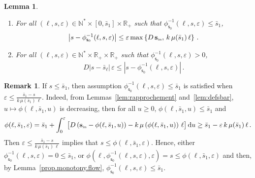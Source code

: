 \documentclass[10pt]{amsart}
\newtheorem{lemm}[theo]{Lemma}\newtheorem{prop}[theo]{Proposition}\newtheorem{coro}[theo]{Corollary}\newtheorem{conj}[theo]{Conjecture}
\theoremstyle{definition}\newtheorem{defi}[theo]{Definition}\newtheorem{rema}[theo]{Remark}\newtheorem{exam}[theo]{Example}\newtheorem{exem}[theo]{Example}\newtheorem{nota}[theo]{Notation}
\newcommand{\RR}{\mathbb{R}}
\newcommand{\NN}{\mathbb{N}}
\newcommand{\Sin}{{\mathbf s}_{\textrm{\tiny\rm in}}}
\newcommand{\dif}{\mathrm{d}}
\newcommand{\barmu}{\mu(\bar s_1)}
\newcommand{\phis}{\phi_{\textsf{s}_0}^{-1}}
\newcommand{\1}{\mathbf{1}}
\begin{document}
\begin{lemm}\label{lemme.control.phi_moins_s}\leavevmode
\begin{enumerate}
\item \label{lemme.control.phi_moins_s.maj}
For all $(\ell,s,\varepsilon)\in \NN^* \times [0,\bar s_1]\times \RR_+$ such that $\phis(\ell,s,\varepsilon)\leq \bar s_1$,
\[
\left|s-\phis(\ell,s,\varepsilon)\right| \leq \varepsilon \max\left\{D\,\Sin,\,k\,\barmu\,\ell\right\}\,.
\]
\item \label{lemme.control.phi_moins_s.min}
For all $(\ell,s,\varepsilon)\in \NN^* \times \RR_+\times \RR_+$ such that $\phis(\ell,s,\varepsilon)>0$,
\[
D|s-\bar s_\ell|\,\varepsilon \leq \left|s-\phis(\ell,s,\varepsilon)\right|\,.
\]
\end{enumerate}
\end{lemm}


\begin{rema}\label{phis0.less.sin}
If $s\leq \bar s_1$, then assumption $\phis(\ell,s,\varepsilon)\leq \bar s_1$ is satisfied when $\varepsilon\leq \frac{\bar s_1-s}{k\,\barmu\,\ell}$. Indeed, from Lemmas~\ref{lem:rapprochement} and~\ref{lem:defsbar}, $u\mapsto \phi(\ell,\bar s_1,u)$ is decreasing, then for all $u\geq 0$, $\phi(\ell,\bar s_1,u)\leq \bar s_1$ and
\begin{align*}
\phi(\ell,\bar s_1,\varepsilon) = \bar s_1 + \int_0^\varepsilon \big[D\left(\Sin-\phi(\ell,\bar s_1, u)\right)-k\,\mu\left(\phi(\ell,\bar s_1, u)\right)\,\ell\big]\,\dif u
\geq \bar s_1-\varepsilon\,k\,\barmu\,\ell\,.
\end{align*}
Then $\varepsilon\leq \frac{\bar s_1-s}{k\,\barmu\,\ell}$ implies that $s\leq \phi(\ell,\bar s_1,\varepsilon)$. Hence, either $\phis(\ell,s,\varepsilon)=0\leq \bar s_1$, or $\phi(\ell,\phis(\ell,s,\varepsilon),\varepsilon) = s \leq \phi(\ell,\bar s_1,\varepsilon)$ and then, by Lemma~\ref{prop.monotony.flow}, $\phis(\ell,s,\varepsilon)\leq \bar s_1$.
\end{rema}
\end{document}
